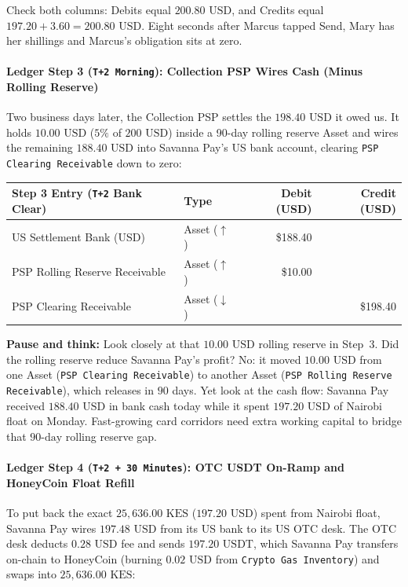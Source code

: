Check both columns: Debits equal $200.80\text{ USD}$, and Credits equal $197.20 + 3.60 = 200.80\text{ USD}$. Eight seconds after Marcus tapped Send, Mary has her shillings and Marcus's obligation sits at zero.

\paragraph{Ledger Step 3 (\texttt{T+2 Morning}): Collection PSP Wires Cash (Minus Rolling Reserve)}
Two business days later, the Collection PSP settles the $198.40\text{ USD}$ it owed us. It holds $10.00\text{ USD}$ ($5\%$ of $200\text{ USD}$) inside a 90-day rolling reserve Asset and wires the remaining $188.40\text{ USD}$ into Savanna Pay's US bank account, clearing \texttt{PSP Clearing Receivable} down to zero:

\begin{center}
\small
\begin{tabular}{llrr}
\toprule
\textbf{Step 3 Entry (\texttt{T+2} Bank Clear)} & \textbf{Type} & \textbf{Debit (USD)} & \textbf{Credit (USD)} \\
\midrule
US Settlement Bank (USD) & Asset ($\uparrow$) & \$188.40 & \\
PSP Rolling Reserve Receivable & Asset ($\uparrow$) & \$10.00 & \\
PSP Clearing Receivable & Asset ($\downarrow$) & & \$198.40 \\
\bottomrule
\end{tabular}
\end{center}

\begin{recoverybox}
\textbf{Pause and think:} Look closely at that $10.00\text{ USD}$ rolling reserve in Step~3. Did the rolling reserve reduce Savanna Pay's profit? No: it moved $10.00\text{ USD}$ from one Asset (\texttt{PSP Clearing Receivable}) to another Asset (\texttt{PSP Rolling Reserve Receivable}), which releases in $90$ days. Yet look at the cash flow: Savanna Pay received $188.40\text{ USD}$ in bank cash today while it spent $197.20\text{ USD}$ of Nairobi float on Monday. Fast-growing card corridors need extra working capital to bridge that $90\text{-day}$ rolling reserve gap.
\end{recoverybox}

\paragraph{Ledger Step 4 (\texttt{T+2 + 30 Minutes}): OTC USDT On-Ramp and HoneyCoin Float Refill}
To put back the exact $25{,}636.00\text{ KES}$ ($197.20\text{ USD}$) spent from Nairobi float, Savanna Pay wires $197.48\text{ USD}$ from its US bank to its US OTC desk. The OTC desk deducts $0.28\text{ USD}$ fee and sends $197.20\text{ USDT}$, which Savanna Pay transfers on-chain to HoneyCoin (burning $0.02\text{ USD}$ from \texttt{Crypto Gas Inventory}) and swaps into $25{,}636.00\text{ KES}$:

